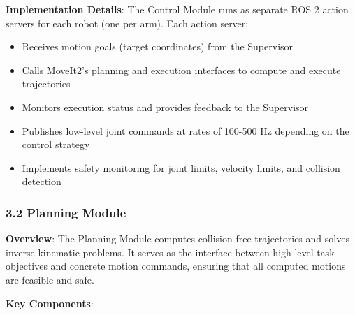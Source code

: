 \textbf{Implementation Details}:
The Control Module runs as separate ROS 2 action servers for each robot (one per arm). Each action server:
\begin{itemize}
    \item Receives motion goals (target coordinates) from the Supervisor
    \item Calls MoveIt2's planning and execution interfaces to compute and execute trajectories
    \item Monitors execution status and provides feedback to the Supervisor
    \item Publishes low-level joint commands at rates of 100-500 Hz depending on the control strategy
    \item Implements safety monitoring for joint limits, velocity limits, and collision detection
\end{itemize}

\subsubsection{3.2 Planning Module}
\label{subsubsec:planning_module}

\textbf{Overview}: The Planning Module computes collision-free trajectories and solves inverse kinematic problems. It serves as the interface between high-level task objectives and concrete motion commands, ensuring that all computed motions are feasible and safe.

\textbf{Key Components}:

